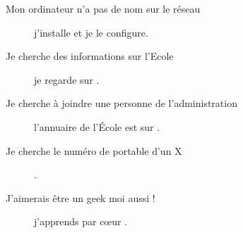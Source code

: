 \begin{description}
\item[Mon ordinateur n'a pas de nom sur le réseau] j'installe  et je le configure.

\item[Je cherche des informations sur l'Ecole] je regarde sur .

\item[Je cherche à joindre une personne de l'administration] l'annuaire de l'École est sur \linebreak{} .

\item[Je cherche le numéro de portable d'un X] .

\item[J'aimerais être un geek moi aussi !] j'apprends par c\oe ur .

\end{description}
